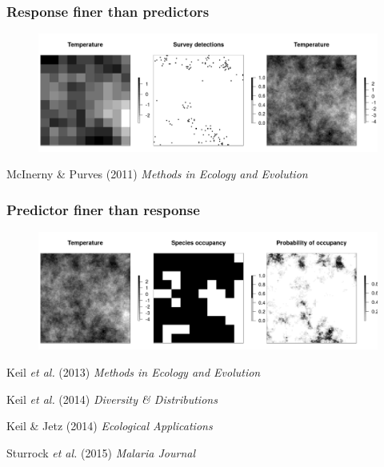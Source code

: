 \documentclass[xcolor=x11names, compress]{beamer}
\renewcommand{\(}{\begin{columns}}
\renewcommand{\)}{\end{columns}}
\newcommand{\<}[1]{\begin{column}{#1}}
\renewcommand{\>}{\end{column}}
\begin{document}

\begin{frame}
\frametitle{Response finer than predictors}
\begin{figure}
	\includegraphics[width=1\linewidth]{fig/maps_multiII.png}
\end{figure}

\footnotesize{McInerny \& Purves (2011) \textit{Methods in Ecology and Evolution}}
\end{frame}


\begin{frame}
\frametitle{Predictor finer than response}
\begin{figure}
	\includegraphics[width=1\linewidth]{fig/maps_multiI.png}
\end{figure}

\footnotesize{Keil \textit{et al.} (2013) \textit{Methods in Ecology and Evolution} }

\footnotesize{Keil \textit{et al.} (2014) \textit{Diversity \& Distributions} }

\footnotesize{Keil \& Jetz (2014) \textit{Ecological Applications} }

\footnotesize{Sturrock \textit{et al.} (2015) \textit{Malaria Journal}}

\end{frame}


\end{document}
